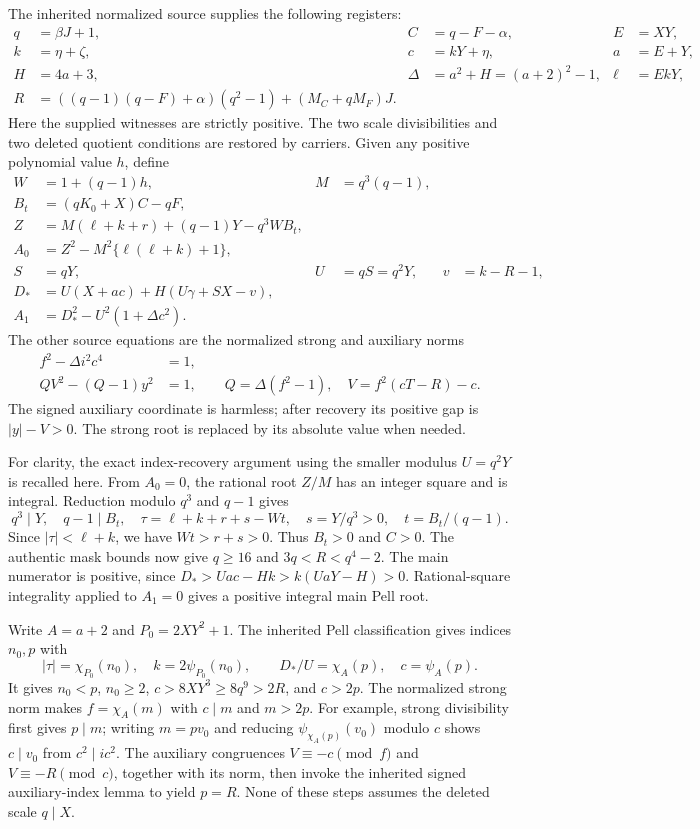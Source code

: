 The inherited normalized source supplies the following registers:
\begin{align*}
 q&=\beta J+1,& C&=q-F-\alpha,&E&=XY,\\
 k&=\eta+\zeta,&c&=kY+\eta,&a&=E+Y,\\
 H&=4a+3,&\Delta&=a^2+H=(a+2)^2-1,&\ell&=EkY,\\
 R&=((q-1)(q-F)+\alpha)(q^2-1)+(M_C+qM_F)J.
\end{align*}
Here the supplied witnesses are strictly positive. The two scale
divisibilities and two deleted quotient conditions are restored by
carriers. Given any positive polynomial value $h$, define
\begin{align}
 W&=1+(q-1)h,&M&=q^3(q-1),\nonumber\\
 B_t&=(qK_0+X)C-qF,\nonumber\\
 Z&=M(\ell+k+r)+(q-1)Y-q^3WB_t,\nonumber\\
 A_0&=Z^2-M^2\{\ell(\ell+k)+1\},                 \label{pp:first}\\
 S&=qY,&U&=qS=q^2Y,&v&=k-R-1,\nonumber\\
 D_*&=U(X+ac)+H(U\gamma+SX-v),\nonumber\\
 A_1&=D_*^2-U^2(1+\Delta c^2).                  \label{pp:main}
\end{align}
The other source equations are the normalized strong and auxiliary norms
\begin{align}
 f^2-\Delta i^2c^4&=1,\nonumber\\
 QV^2-(Q-1)y^2&=1,\qquad
 Q=\Delta(f^2-1),\quad V=f^2(cT-R)-c.            \label{pp:strongaux}
\end{align}
The signed auxiliary coordinate is harmless; after recovery its positive
gap is $|y|-V>0$. The strong root is replaced by its absolute value when
needed.

For clarity, the exact index-recovery argument using the smaller modulus
$U=q^2Y$ is recalled here. From $A_0=0$, the rational root $Z/M$ has an
integer square and is integral. Reduction modulo $q^3$ and $q-1$ gives
\[
 q^3\mid Y,\quad q-1\mid B_t,\quad
 \tau=\ell+k+r+s-Wt,\quad
 s=Y/q^3>0,\quad t=B_t/(q-1).
\]
Since $|\tau|<\ell+k$, we have $Wt>r+s>0$. Thus $B_t>0$ and $C>0$.
The authentic mask bounds now give $q\ge16$ and $3q<R<q^4-2$.
The main numerator is positive, since
$D_*>Uac-Hk>k(UaY-H)>0$. Rational-square integrality applied to
$A_1=0$ gives a positive integral main Pell root.

Write $A=a+2$ and $P_0=2XY^2+1$. The inherited Pell classification gives
indices $n_0,p$ with
\[
 |\tau|=\chi_{P_0}(n_0),\quad k=2\psi_{P_0}(n_0),\qquad
 D_*/U=\chi_A(p),\quad c=\psi_A(p).
\]
It gives $n_0<p$, $n_0\ge2$, $c>8XY^3\ge8q^9>2R$, and $c>2p$.
The normalized strong norm makes $f=\chi_A(m)$ with $c\mid m$ and
$m>2p$. For example, strong divisibility first gives $p\mid m$; writing
$m=pv_0$ and reducing $\psi_{\chi_A(p)}(v_0)$ modulo $c$ shows
$c\mid v_0$ from $c^2\mid ic^2$. The auxiliary congruences
$V\equiv-c\pmod f$ and $V\equiv-R\pmod c$, together with its norm,
then invoke the inherited signed auxiliary-index lemma to yield $p=R$.
None of these steps assumes the deleted scale $q\mid X$.

